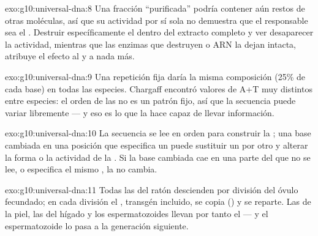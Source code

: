 \begin{solution}{exo:g10:universal-dna:8}
Una fracción ``purificada'' podría contener aún restos de otras
moléculas, así que su actividad por sí sola no demuestra que el
responsable sea el . Destruir específicamente el  dentro del
extracto completo y ver desaparecer la actividad, mientras que las
enzimas que destruyen  o ARN la dejan intacta, atribuye el
efecto al  y a nada más.
\end{solution}

\begin{solution}{exo:g10:universal-dna:9}
Una repetición fija daría la misma composición (25\% de cada base) en
todas las especies. Chargaff encontró valores de A+T muy distintos
entre especies: el orden de las  no es un patrón fijo, así que la
secuencia puede variar libremente --- y eso es lo que la hace capaz de
llevar información.
\end{solution}

\begin{solution}{exo:g10:universal-dna:10}
La secuencia se lee en orden para construir la ; una base
cambiada en una posición que especifica un  puede sustituir
un  por otro y alterar la forma o la actividad de la
. Si la base cambiada cae en una parte del  que no se lee, o
especifica el mismo , la  no cambia.
\end{solution}

\begin{solution}{exo:g10:universal-dna:11}
Todas las  del ratón descienden por división del óvulo
fecundado; en cada división el , transgén incluido, se copia
() y se reparte. Las  de la piel, las del
hígado y los espermatozoides llevan por tanto el  --- y el
espermatozoide lo pasa a la generación siguiente.
\end{solution}

